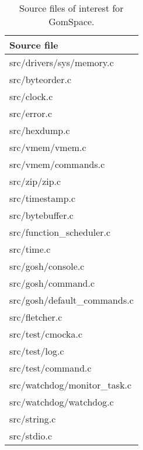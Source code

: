 
\begin{table}[tb]
\scriptsize
\centering
\caption{Source files of interest for GomSpace.}
\label{table:interesting}
\begin{tabular}{l}
\hline
\textbf{Source file}\\
\hline
src/drivers/sys/memory.c\\
src/byteorder.c\\
src/clock.c\\
src/error.c\\
src/hexdump.c\\
src/vmem/vmem.c\\
src/vmem/commands.c\\
src/zip/zip.c\\
src/timestamp.c\\
src/bytebuffer.c\\
src/function\_scheduler.c\\
src/time.c\\
src/gosh/console.c\\
src/gosh/command.c\\
src/gosh/default\_commands.c\\
src/fletcher.c\\
src/test/cmocka.c\\
src/test/log.c\\
src/test/command.c\\
src/watchdog/monitor\_task.c\\
src/watchdog/watchdog.c\\
src/string.c\\
src/stdio.c\\
\hline
\end{tabular}
\end{table}